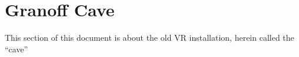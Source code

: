 \documentclass[11pt]{article}
\newcommand{\yurt}{YURT\xspace}
\newcommand{\cmd}[1]{\texttt{#1}\xspace}
\begin{document}
























\section{Granoff Cave}

This section of this document is about the old VR installation, herein
called the ``cave''
\end{document}
